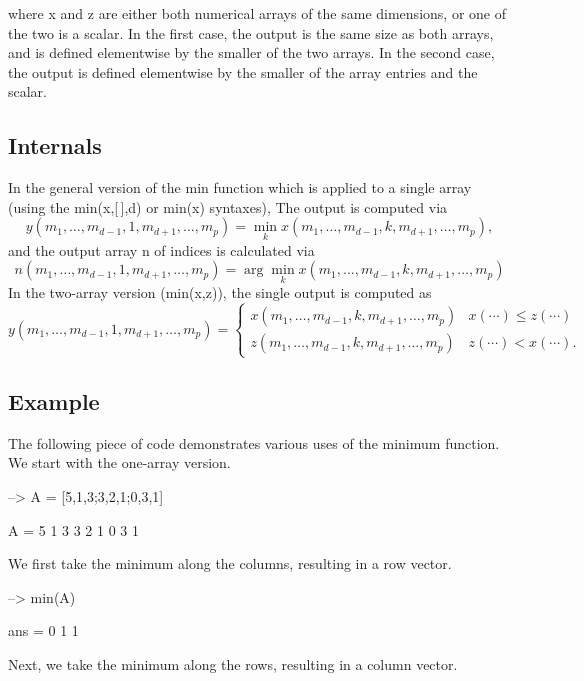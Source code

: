  where {\ttfamily x} and {\ttfamily z} are either both numerical arrays of the same dimensions, or one of the two is a scalar. In the first case, the output is the same size as both arrays, and is defined elementwise by the smaller of the two arrays. In the second case, the output is defined elementwise by the smaller of the array entries and the scalar. \hypertarget{transforms_svd_Function}{}\subsection{Internals}\label{transforms_svd_Function}
In the general version of the {\ttfamily min} function which is applied to a single array (using the {\ttfamily min(x,\mbox{[}$\,$\mbox{]},d)} or {\ttfamily min(x)} syntaxes), The output is computed via \[ y(m_1,\ldots,m_{d-1},1,m_{d+1},\ldots,m_{p}) = \min_{k} x(m_1,\ldots,m_{d-1},k,m_{d+1},\ldots,m_{p}), \] and the output array {\ttfamily n} of indices is calculated via \[ n(m_1,\ldots,m_{d-1},1,m_{d+1},\ldots,m_{p}) = \arg \min_{k} x(m_1,\ldots,m_{d-1},k,m_{d+1},\ldots,m_{p}) \] In the two-\/array version ({\ttfamily min(x,z)}), the single output is computed as \[ y(m_1,\ldots,m_{d-1},1,m_{d+1},\ldots,m_{p}) = \begin{cases} x(m_1,\ldots,m_{d-1},k,m_{d+1},\ldots,m_{p}) & x(\cdots) \leq z(\cdots) \\ z(m_1,\ldots,m_{d-1},k,m_{d+1},\ldots,m_{p}) & z(\cdots) < x(\cdots). \end{cases} \] \hypertarget{variables_struct_Example}{}\subsection{Example}\label{variables_struct_Example}
The following piece of code demonstrates various uses of the minimum function. We start with the one-\/array version.


\begin{DoxyVerbInclude}
--> A = [5,1,3;3,2,1;0,3,1]

A = 
 5 1 3 
 3 2 1 
 0 3 1 
\end{DoxyVerbInclude}


We first take the minimum along the columns, resulting in a row vector.


\begin{DoxyVerbInclude}
--> min(A)

ans = 
 0 1 1 
\end{DoxyVerbInclude}


Next, we take the minimum along the rows, resulting in a column vector.


